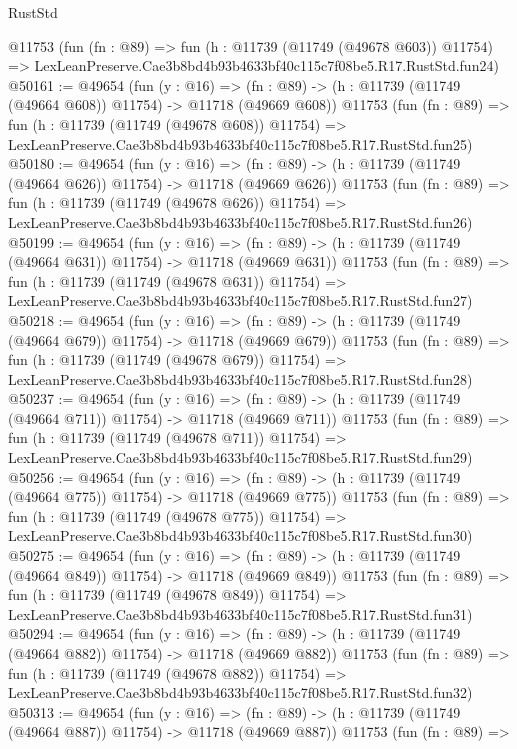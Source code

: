 \begin{lexlean}{RustStd}
\begin{coremodule}
    @11753
    (fun (fn : @89) =>
    fun (h : @11739 (@11749 (@49678 @603)) @11754) =>
    LexLeanPreserve.Cae3b8bd4b93b4633bf40c115c7f08be5.R17.RustStd.fun24)
@50161 := @49654
    (fun (y : @16) =>
    (fn : @89) -> (h : @11739 (@11749 (@49664 @608)) @11754) -> @11718 (@49669 @608))
    @11753
    (fun (fn : @89) =>
    fun (h : @11739 (@11749 (@49678 @608)) @11754) =>
    LexLeanPreserve.Cae3b8bd4b93b4633bf40c115c7f08be5.R17.RustStd.fun25)
@50180 := @49654
    (fun (y : @16) =>
    (fn : @89) -> (h : @11739 (@11749 (@49664 @626)) @11754) -> @11718 (@49669 @626))
    @11753
    (fun (fn : @89) =>
    fun (h : @11739 (@11749 (@49678 @626)) @11754) =>
    LexLeanPreserve.Cae3b8bd4b93b4633bf40c115c7f08be5.R17.RustStd.fun26)
@50199 := @49654
    (fun (y : @16) =>
    (fn : @89) -> (h : @11739 (@11749 (@49664 @631)) @11754) -> @11718 (@49669 @631))
    @11753
    (fun (fn : @89) =>
    fun (h : @11739 (@11749 (@49678 @631)) @11754) =>
    LexLeanPreserve.Cae3b8bd4b93b4633bf40c115c7f08be5.R17.RustStd.fun27)
@50218 := @49654
    (fun (y : @16) =>
    (fn : @89) -> (h : @11739 (@11749 (@49664 @679)) @11754) -> @11718 (@49669 @679))
    @11753
    (fun (fn : @89) =>
    fun (h : @11739 (@11749 (@49678 @679)) @11754) =>
    LexLeanPreserve.Cae3b8bd4b93b4633bf40c115c7f08be5.R17.RustStd.fun28)
@50237 := @49654
    (fun (y : @16) =>
    (fn : @89) -> (h : @11739 (@11749 (@49664 @711)) @11754) -> @11718 (@49669 @711))
    @11753
    (fun (fn : @89) =>
    fun (h : @11739 (@11749 (@49678 @711)) @11754) =>
    LexLeanPreserve.Cae3b8bd4b93b4633bf40c115c7f08be5.R17.RustStd.fun29)
@50256 := @49654
    (fun (y : @16) =>
    (fn : @89) -> (h : @11739 (@11749 (@49664 @775)) @11754) -> @11718 (@49669 @775))
    @11753
    (fun (fn : @89) =>
    fun (h : @11739 (@11749 (@49678 @775)) @11754) =>
    LexLeanPreserve.Cae3b8bd4b93b4633bf40c115c7f08be5.R17.RustStd.fun30)
@50275 := @49654
    (fun (y : @16) =>
    (fn : @89) -> (h : @11739 (@11749 (@49664 @849)) @11754) -> @11718 (@49669 @849))
    @11753
    (fun (fn : @89) =>
    fun (h : @11739 (@11749 (@49678 @849)) @11754) =>
    LexLeanPreserve.Cae3b8bd4b93b4633bf40c115c7f08be5.R17.RustStd.fun31)
@50294 := @49654
    (fun (y : @16) =>
    (fn : @89) -> (h : @11739 (@11749 (@49664 @882)) @11754) -> @11718 (@49669 @882))
    @11753
    (fun (fn : @89) =>
    fun (h : @11739 (@11749 (@49678 @882)) @11754) =>
    LexLeanPreserve.Cae3b8bd4b93b4633bf40c115c7f08be5.R17.RustStd.fun32)
@50313 := @49654
    (fun (y : @16) =>
    (fn : @89) -> (h : @11739 (@11749 (@49664 @887)) @11754) -> @11718 (@49669 @887))
    @11753
    (fun (fn : @89) =>

\end{coremodule}
\end{lexlean}
